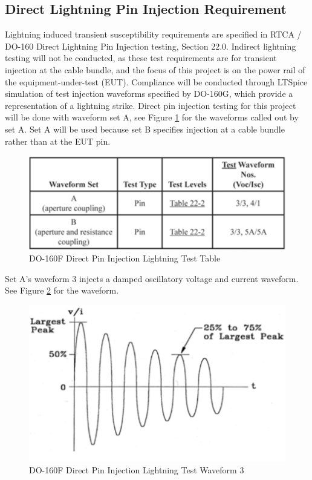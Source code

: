 \documentclass[conference]{IEEEtran}
\begin{document}
\subsection{Direct Lightning Pin Injection Requirement}
Lightning induced transient susceptibility requirements are specified in RTCA / DO-160 Direct Lightning Pin Injection testing, Section 22.0. Indirect lightning testing will not be conducted, as these test requirements are for transient injection at the cable bundle, and the focus of this project is on the power rail of the equipment-under-test (EUT). Compliance will be conducted through LTSpice simulation of test injection waveforms specified by DO-160G, which provide a representation of a lightning strike. Direct pin injection testing for this project will be done with waveform set A, see Figure \ref{fig:do-160f_pin_injection_test_table} for the waveforms called out by set A. Set A will be used because set B specifies injection at a cable bundle rather than at the EUT pin. 

\begin{figure}[hp]
    \centering
    \includegraphics[width=1.0\linewidth]{do-160f_pin_injection_test_table.png}
    \caption{DO-160F Direct Pin Injection Lightning Test Table}
    \label{fig:do-160f_pin_injection_test_table}
\end{figure}

Set A's waveform 3 injects a damped oscillatory voltage and current waveform. See Figure \ref{fig:do-160f_waveform_set_3_diagram} for the waveform.

\begin{figure}[hp]
    \centering
    \includegraphics[width=1.0\linewidth]{do-160f_waveform_set_3.png}
    \caption{DO-160F Direct Pin Injection Lightning Test Waveform 3}
    \label{fig:do-160f_waveform_set_3_diagram}
\end{figure}
\end{document}
